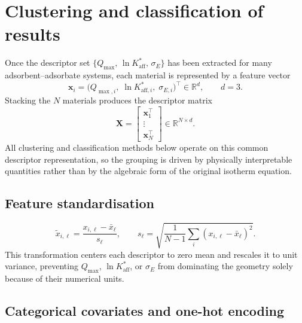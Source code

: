 \documentclass[journal=aamick,manuscript=article]{achemso}
\begin{document}
\section{Clustering and classification of results}
\label{sec:si_clustering}

Once the descriptor set
$\{Q_{\max},\, \ln K_{\mathrm{aff}}^{\ast},\, \sigma_E\}$ has been
extracted for many adsorbent--adsorbate systems, each material is
represented by a feature vector
\begin{equation}
	\mathbf{x}_i
	=
	\bigl(
	Q_{\max,i},\;
	\ln K_{\mathrm{aff},i}^{\ast},\;
	\sigma_{E,i}
	\bigr)^\top
	\in \mathbb{R}^{d},
	\qquad d=3.
	\label{eq:si_feature_vector}
\end{equation}
Stacking the $N$ materials produces the descriptor matrix
\begin{equation}
	\mathbf{X}
	=
	\begin{bmatrix}
	\mathbf{x}_1^\top\\
	\vdots\\
	\mathbf{x}_N^\top
	\end{bmatrix}
	\in \mathbb{R}^{N\times d}.
	\label{eq:si_feature_matrix}
\end{equation}
All clustering and classification methods below operate on this common
descriptor representation, so the grouping is driven by physically
interpretable quantities rather than by the algebraic form of the
original isotherm equation.

\subsection{Feature standardisation}
\label{sec:si_standardisation}
\begin{equation}
	\tilde{x}_{i,\ell}
	= \frac{x_{i,\ell} - \bar{x}_\ell}{s_\ell},
	\qquad
	s_\ell = \sqrt{\frac{1}{N-1}\sum_{i}(x_{i,\ell} - \bar{x}_\ell)^2}.
	\label{eq:si_standardise}
\end{equation}
This transformation centers each descriptor to zero mean and rescales it
to unit variance, preventing $Q_{\max}$, $\ln K_{\mathrm{aff}}^{\ast}$,
or $\sigma_E$ from dominating the geometry solely because of their
numerical units.

\subsection{Categorical covariates and one-hot encoding}
\label{sec:si_onehot}
\end{document}
